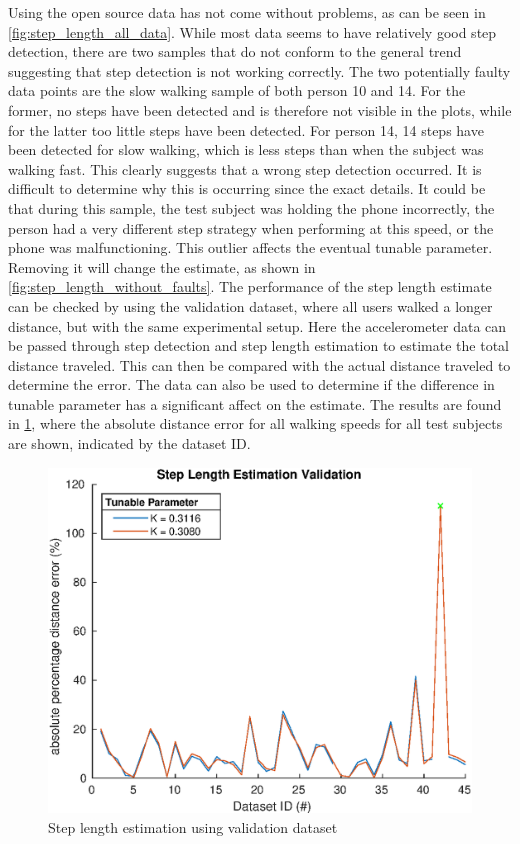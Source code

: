 Using the open source data has not come without problems, as can be seen in \cref{fig:step_length_all_data}. While most data seems to have relatively good step detection, there are two samples that do not conform to the general trend suggesting that step detection is not working correctly. The two potentially faulty data points are the slow walking sample of both person 10 and 14. For the former, no steps have been detected and is therefore not visible in the plots, while for the latter too little steps have been detected. For person 14, 14 steps have been detected for slow walking, which is less steps than when the subject was walking fast. This clearly suggests that a wrong step detection occurred. It is difficult to determine why this is occurring since the exact details. It could be that during this sample, the test subject was holding the phone incorrectly, the person had a very different step strategy when performing at this speed, or the phone was malfunctioning. This outlier affects the eventual tunable parameter. Removing it will change the estimate, as shown in \cref{fig:step_length_without_faults}. The performance of the step length estimate can be checked by using the validation dataset, where all users walked a longer distance, but with the same experimental setup. Here the accelerometer data can be passed through step detection and step length estimation to estimate the total distance traveled. This can then be compared with the actual distance traveled to determine the error. The data can also be used to determine if the difference in tunable parameter has a significant affect on the estimate. The results are found in  \cref{fig:step_length_estimation_validation}, where the absolute distance error for all walking speeds for all test subjects are shown, indicated by the dataset ID.
\begin{figure}[H]
	\centering
	\includegraphics[width=0.6\linewidth]{images/20201028_1344_Step_Length_Estimation_Validation}
	\caption{Step length estimation using validation dataset}
	\label{fig:step_length_estimation_validation}
\end{figure}

